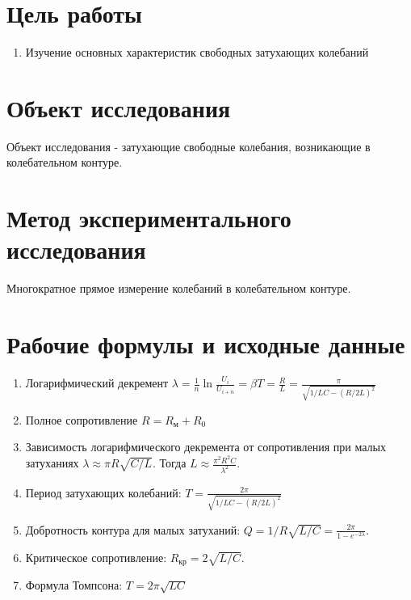 \section{Цель работы}
\begin{enumerate}
    \item Изучение основных характеристик свободных затухающих колебаний
\end{enumerate}

\section{Объект исследования}
Объект исследования - затухающие свободные колебания, возникающие в колебательном контуре.

\section{Метод экспериментального исследования}
Многократное прямое измерение колебаний в колебательном контуре.

\section{Рабочие формулы и исходные данные}
\begin{enumerate}
  \item Логарифмический декремент
    \( \lambda = \frac{1}{n} \ln \frac{U_i}{U_{i+n}} = \beta T = \frac{R}{L} = \frac{\pi}{\sqrt{1/LC - (R/2L)^2}} \)
  \item Полное сопротивление \(R = R_\text{м} + R_0 \)
  \item Зависимость логарифмического декремента от сопротивления при малых затуханиях
    \( \lambda \approx \pi R \sqrt{C/L} \).
    Тогда
    \( L \approx \frac{\pi^2 R^2 C}{\lambda^2} \).

  \item Период затухающих колебаний:
    \( T = \frac{2 \pi}{\sqrt{1/LC - (R/2L)^2}} \)

  \item Добротность контура для малых затуханий:
    \( Q = 1/R \sqrt{L/C} = \frac{2 \pi}{1 - e^{-2 \lambda}} \).

  \item Критическое сопротивление: \( R_{кр} = 2 \sqrt{L/C} \).

  \item Формула Томпсона:
    \( T = 2 \pi \sqrt{L C} \)
\end{enumerate}

